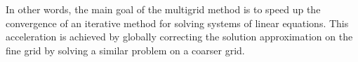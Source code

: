 \highspace
In other words, the main goal of the multigrid method is to speed up the convergence of an iterative method for solving systems of linear equations. This acceleration is achieved by globally correcting the solution approximation on the fine grid by solving a similar problem on a coarser grid.